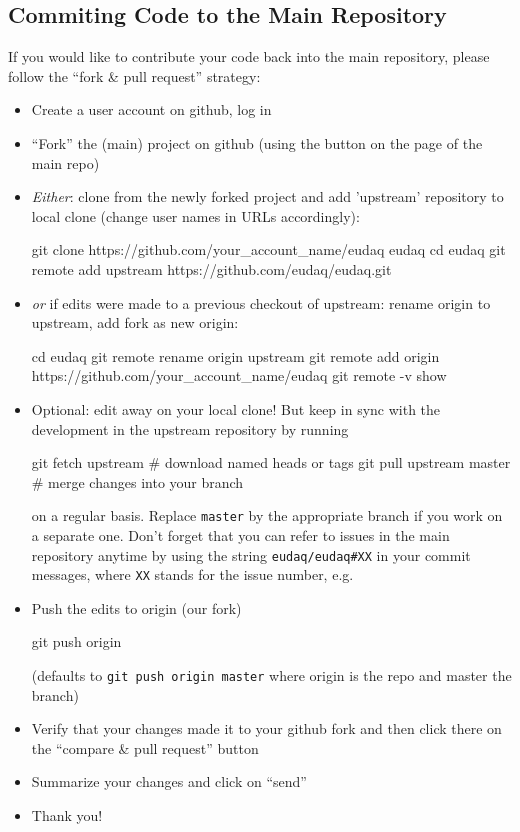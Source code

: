 \subsection{Commiting Code to the Main Repository}
\label{sec:commiting}



If you would like to contribute your code back into the main repository, please follow the ``fork \& pull request'' strategy:

\begin{itemize}
\item Create a user account on github, log in
\item ``Fork'' the (main) project on github (using the button on the page of the main repo)
\item \emph{Either}: clone from the newly forked project and add
  'upstream' repository to local clone (change user names in URLs
  accordingly):
  \begin{listing}[mybash]
git clone https://github.com/your_account_name/eudaq eudaq
cd eudaq
git remote add upstream https://github.com/eudaq/eudaq.git
\end{listing}
\item \emph{or} if edits were made to a previous checkout of upstream: rename origin to upstream, add fork as new origin:

  \begin{listing}[mybash]
cd eudaq
git remote rename origin upstream
git remote add origin https://github.com/your_account_name/eudaq
git remote -v show
\end{listing}
\item Optional: edit away on your local clone! But keep in sync with
  the development in the upstream repository by running
  \begin{listing}
git fetch upstream        # download named heads or tags
git pull upstream master  # merge changes into your branch
\end{listing}
on a regular basis. Replace \texttt{master} by the appropriate branch if you work on a separate one.
Don't forget that you can refer to issues in the main repository anytime by using the string \texttt{eudaq/eudaq\#XX} in your commit messages, where \texttt{XX} stands for the issue number, e.g.
\item Push the edits to origin (our fork)
  \begin{listing}[mybash]
git push origin
\end{listing}
(defaults to \texttt{git push origin master} where origin is the repo and master the branch)
\item Verify that your changes made it to your github fork and then click there on the ``compare \& pull request'' button
\item Summarize your changes and click on ``send''
\item Thank you!
\end{itemize}


